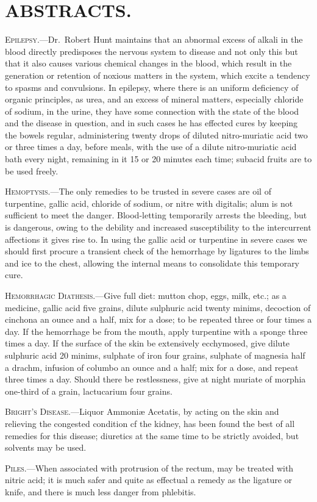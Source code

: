 \section*{ABSTRACTS.}

\textsc{Epilepsy.}---Dr.~Robert Hunt maintains that an abnormal excess of
alkali in the blood directly predisposes the nervous system to disease
and not only this but that it also causes various chemical changes in
the blood, which result in the generation or retention of noxious matters
in the system, which excite a tendency to spasms and convulsions. In
epilepsy, where there is an uniform deficiency of organic principles, as
urea, and an excess of mineral matters, especially chloride of sodium,
in the urine, they have some connection with the state of the blood and
the disease in question, and in such cases he has effected cures by keeping
the bowels regular, administering twenty drops of diluted nitro-muriatic
acid two or three times a day, before meals, with the use of a
dilute nitro-muriatic acid bath every night, remaining in it 15 or 20
minutes each time; subacid fruits are to be used freely.

\textsc{Hemoptysis.}---The only remedies to be trusted in severe cases are oil
of turpentine, gallic acid, chloride of sodium, or nitre with digitalis;
alum is not sufficient to meet the danger. Blood-letting temporarily
arrests the bleeding, but is dangerous, owing to the debility and increased
susceptibility to the intercurrent affections it gives rise to. In using the
gallic acid or turpentine in severe cases we should first procure a transient
check of the hemorrhage by ligatures to the limbs and ice to the chest,
allowing the internal means to consolidate this temporary cure.

\textsc{Hemorrhagic Diathesis.}---Give full diet: mutton chop, eggs, milk,
etc.; as a medicine, gallic acid five grains, dilute sulphuric acid twenty
minims, decoction of cinchona an ounce and a half, mix for a dose; to
be repeated three or four times a day. If the hemorrhage be from the
mouth, apply turpentine with a sponge three times a day. If the surface
of the skin be extensively ecchymosed, give dilute sulphuric acid 20
minims, sulphate of iron four grains, sulphate of magnesia half a drachm,
infusion of columbo an ounce and a half; mix for a dose, and repeat
three times a day. Should there be restlessness, give at night muriate
of morphia one-third of a grain, lactucarium four grains.

\textsc{Bright's Disease.}---Liquor Ammoniæ Acetatis, by acting on the skin
and relieving the congested condition cf the kidney, has been found the
best of all remedies for this disease; diuretics at the same time to be
strictly avoided, but solvents may be used.

\textsc{Piles.}---When associated with protrusion of the rectum, may be
treated with nitric acid; it is much safer and quite as effectual a
remedy as the ligature or knife, and there is much less danger from
phlebitis.\endinput
